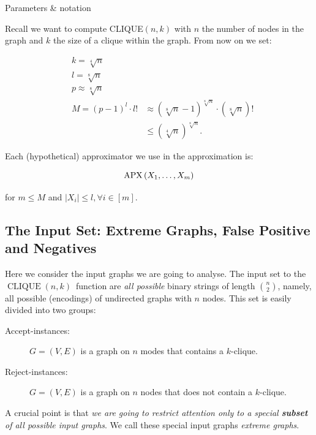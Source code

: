 \begin{trailer}{Parameters \& notation}

Recall we want to compute CLIQUE$(n, k)$
with $n$ the number of nodes in the graph and $k$ the size of a clique within the graph. 
From now on we set:


$$
\begin{aligned}
& k=\sqrt[4]{n} \\
& l=\sqrt[8]{n} \\
& p \approx \sqrt[8]{n} \\
& M=(p-1)^l \cdot l! & \approx(\sqrt[8]{n}-1)^{\sqrt[8]{n}} \cdot(\sqrt[8]{n})! \\
& & \leq(\sqrt[4]{n})^{\sqrt[8]{n}}.
\end{aligned}
$$


Each (hypothetical) approximator we use in the approximation is:

$$
\mathrm{APX}\left(X_1, \ldots, X_m\right)
$$

for $m \leq M$ and $\left|X_i\right| \leq l, \forall i \in[m]$.
\end{trailer}

\newcommand{\cliquenk}{\ensuremath{\operatorname{CLIQUE}(n,k)}}

\subsection{The Input Set: Extreme Graphs, False Positive and  Negatives}

Here we consider the input graphs we are going to analyse. 
The input set to the \cliquenk\ function are \emph{all possible} binary strings of length $n\choose 2$, namely, all possible (encodings) of undirected graphs with $n$ nodes. This set is easily divided into two groups:

\begin{description}
\item[Accept-instances:] 
$G=(V, E)$ is a graph on $n$ modes that contains a $k$-clique.
\item[Reject-instances:]
$G=(V, E)$ is a graph on $n$ nodes that does not contain a $k$-clique.
\end{description}


 



A crucial point is that \emph{we are going to restrict attention only to a special \textbf{subset} of all possible input graphs}. We call these special input graphs \emph{extreme graphs}. 

